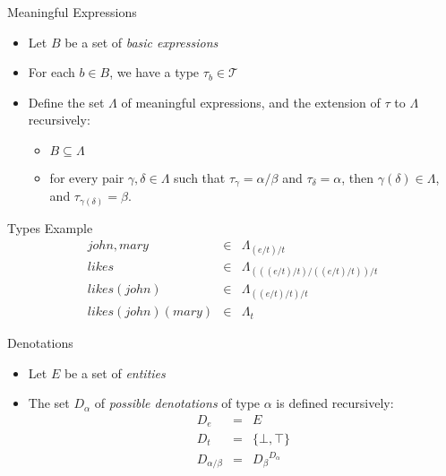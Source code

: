 \documentclass{beamer}
\newlength{\wideitemsep}
\let\olditem\item
\renewcommand{\item}{\setlength{\itemsep}{\wideitemsep}\olditem}
\begin{document}
\begin{frame}{Meaningful Expressions}
\begin{itemize}
\item Let $B$ be a set of \emph{basic expressions}
\item For each $b\in B$, we have a type $\tau_b\in \mathcal{T}$
\item Define the set $\Lambda$ of meaningful expressions, and the extension of $\tau$ to $\Lambda$ recursively:
\begin{itemize}
\item $B\subseteq \Lambda$
\item for every pair $\gamma,\delta\in \Lambda$ such that $\tau_\gamma
  = \alpha/\beta$ and $\tau_\delta = \alpha$, then $\gamma(\delta)\in
  \Lambda$, and $\tau_{\gamma(\delta)} = \beta$.
\end{itemize}
\end{itemize}
\end{frame}

\begin{frame}{Types Example}
\begin{eqnarray*}
\mathit{john},\mathit{mary} & \in & \Lambda_{(e/t)/t}\\
\mathit{likes} & \in & \Lambda_{(((e/t)/t)/((e/t)/t))/t}\\
\mathit{likes}(\mathit{john}) & \in & \Lambda_{((e/t)/t)/t}\\
\mathit{likes}(\mathit{john})(\mathit{mary}) & \in & \Lambda_t
\end{eqnarray*}
\end{frame}

\begin{frame}{Denotations}
\begin{itemize}
\item Let $E$ be a set of \emph{entities}
\item The set $D_\alpha$ of \emph{possible denotations} of type $\alpha$ is
defined recursively:
\begin{eqnarray*}
D_e &=& E\\
D_t &=& \{\bot,\top\}\\
D_{\alpha/\beta} &=& {D_\beta}^{D_\alpha}
\end{eqnarray*}
\end{itemize}
\end{frame}
\end{document}
